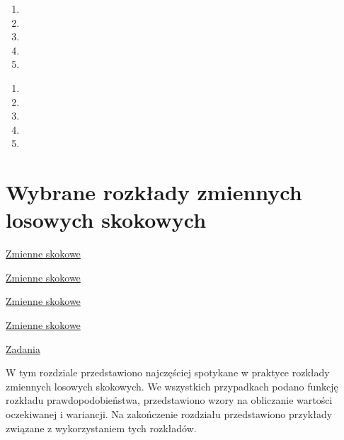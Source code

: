 \documentclass[
  letterpaper,
  DIV=11,
  numbers=noendperiod]{scrreprt}
\providecommand{\tightlist}{%
  \setlength{\itemsep}{0pt}\setlength{\parskip}{0pt}}\usepackage{longtable,booktabs,array}
\begin{document}
\begin{enumerate}
\def\labelenumi{\arabic{enumi}.}
\tightlist
\item
\item
\item
\item
\item
\end{enumerate}

\begin{tcolorbox}[enhanced jigsaw, toprule=.15mm, title={Pytania testowe}, breakable, coltitle=black, titlerule=0mm, colbacktitle=quarto-callout-important-color!10!white, opacitybacktitle=0.6, opacityback=0, bottomtitle=1mm, left=2mm, arc=.35mm, leftrule=.75mm, bottomrule=.15mm, rightrule=.15mm, toptitle=1mm, colframe=quarto-callout-important-color-frame, colback=white]

\end{tcolorbox}

\begin{enumerate}
\def\labelenumi{\arabic{enumi}.}
\tightlist
\item
\item
\item
\item
\item
\end{enumerate}


\chapter{Wybrane rozkłady zmiennych losowych
skokowych}\label{wybrane-rozkux142ady-zmiennych-losowych-skokowych}

\href{https://home.agh.edu.pl/~zak/downloads/4-Elektronika-2015.pdf}{Zmienne
skokowe}

\href{https://e.kul.pl/files/12167/public/statystyka/wyklad23.pdf}{Zmienne
skokowe}

\href{http://statystyka.rezolwenta.eu.org/Materialy/PRS.pdf}{Zmienne
skokowe}

\href{http://www.statystyka.org/statys/rzs/rt/rtt.htm}{Zmienne skokowe}

\href{https://wyznacznik.pl/zmienne-losowe-skokowe-zadania}{Zadania}

W tym rozdziale przedstawiono najczęściej spotykane w praktyce rozkłady
zmiennych losowych skokowych. We wszystkich przypadkach podano funkcję
rozkładu prawdopodobieństwa, przedstawiono wzory na obliczanie wartości
oczekiwanej i wariancji. Na zakończenie rozdziału przedstawiono
przykłady związane z wykorzystaniem tych rozkładów.
\end{document}

